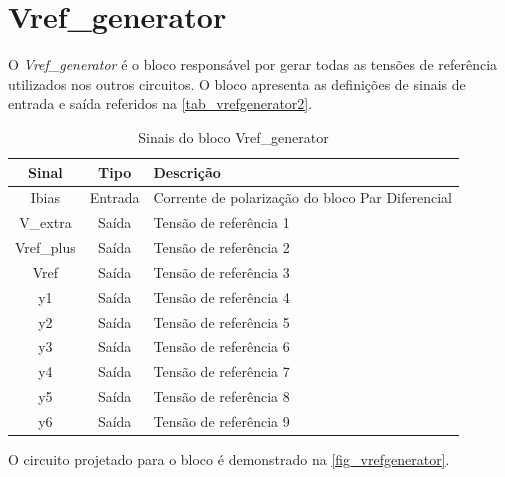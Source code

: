 \renewcommand{\NomeBloco}{Vref\_generator}
\renewcommand{\NomeBlocoNoUnderline}{vrefgenerator}
\renewcommand{\NomePTab}{tab_\NomeBlocoNoUnderline}
\renewcommand{\NomeSTab}{tab_\NomeBlocoNoUnderline2}
\renewcommand{\NomePFig}{fig_\NomeBlocoNoUnderline}
\renewcommand{\NomeSFig}{fig_\NomeBlocoNoUnderline2}
\renewcommand{\NomeTTab}{tab_\NomeBlocoNoUnderline3}
\renewcommand{\NomeQTab}{tab_\NomeBlocoNoUnderline4}

\section{\NomeBloco}

O \emph{\NomeBloco} \'e o bloco respons\'avel por gerar todas as tens\~oes de refer\^encia utilizados nos outros circuitos. O bloco apresenta as defini{\c c}\~oes de sinais de entrada e sa\'ida referidos na \autoref{\NomeSTab}.

\begin{table}[htbp]
\caption{Sinais do bloco \NomeBloco}
\label{\NomeSTab}
\centering
\begin{tabular}{ccl}

    \toprule
    Sinal & Tipo    & Descri{\c c}\~ao      \\
    \midrule \midrule
    Ibias   & Entrada   & Corrente de polariza{\c c}\~ao do bloco Par Diferencial \\
    \midrule
    V\_extra   & Saída   & Tens\~ao de refer\^encia 1 \\
    \midrule
    Vref\_plus   & Saída   & Tens\~ao de refer\^encia 2 \\
    \midrule
    Vref   & Saída   & Tens\~ao de refer\^encia 3 \\
    \midrule
    y1   & Saída   & Tens\~ao de refer\^encia 4 \\
    \midrule
    y2   & Saída   & Tens\~ao de refer\^encia 5 \\
    \midrule
    y3   & Saída   & Tens\~ao de refer\^encia 6 \\
    \midrule
    y4  & Saída   & Tens\~ao de refer\^encia 7 \\
    \midrule
    y5   & Saída   & Tens\~ao de refer\^encia 8 \\
    \midrule
    y6   & Saída   & Tens\~ao de refer\^encia 9 \\
    \bottomrule
\end{tabular}
\end{table}

O circuito projetado para o bloco \'e demonstrado na \autoref{\NomePFig}.


